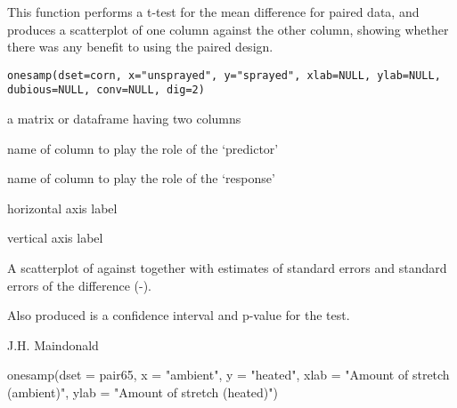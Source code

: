 \begin{Description}\relax
This function performs a t-test for the mean difference for paired data,
and produces a scatterplot of one column against the other column, showing 
whether there was any benefit to using the paired design.
\end{Description}
\begin{Usage}
\begin{verbatim}
onesamp(dset=corn, x="unsprayed", y="sprayed", xlab=NULL, ylab=NULL, dubious=NULL, conv=NULL, dig=2)
\end{verbatim}
\end{Usage}
\begin{Arguments}
\begin{ldescription}
\item[\code{dset}] a matrix or dataframe having two columns
\item[\code{x}] name of column to play the role of the `predictor' 
\item[\code{y}] name of column to play the role of the `response' 
\item[\code{xlab}] horizontal axis label 
\item[\code{ylab}] vertical axis label 
\item[\code{dubious}] 
\item[\code{conv}] 
\item[\code{dig}] 
\end{ldescription}
\end{Arguments}
\begin{Value}
A scatterplot of  against  together with estimates
of standard errors and standard errors of the difference 
(-).

Also produced is a confidence interval and p-value for the test.
\end{Value}
\begin{Author}\relax
J.H. Maindonald
\end{Author}
\begin{Examples}
\begin{ExampleCode}
onesamp(dset = pair65, x = "ambient", y = "heated", xlab =
        "Amount of stretch (ambient)", ylab =
        "Amount of stretch (heated)") 
\end{ExampleCode}
\end{Examples}

